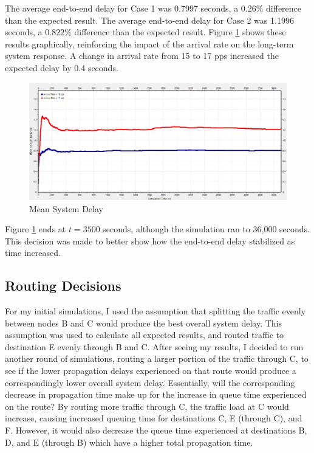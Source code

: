 \documentclass{article}
\begin{document}
The average end-to-end delay for Case 1 was 0.7997 seconds, a $0.26 \%$ difference than the expected result.
The average end-to-end delay for Case 2 was 1.1996 seconds, a $0.822 \%$ difference than the expected result.
Figure \ref{fig:meanSysDelay} shows these results graphically, reinforcing the impact of the arrival rate on the long-term system response.
A change in arrival rate from 15 to 17 pps increased the expected delay by 0.4 seconds.

\begin{figure}[h!]
\centering
\includegraphics[scale=0.5]{Images/MeanSysDelay.PNG}
\caption{Mean System Delay}
\label{fig:meanSysDelay}
\end{figure}

Figure \ref{fig:meanSysDelay} ends at $t=3500$ seconds, although the simulation ran to 36,000 seconds.  
This decision was made to better show how the end-to-end delay stabilized as time increased.


\subsection{Routing Decisions}
For my initial simulations, I used the assumption that splitting the traffic evenly between nodes B and C would produce the best overall system delay.
This assumption was used to calculate all expected results, and routed traffic to destination E evenly through B and C.
After seeing my results, I decided to run another round of simulations, routing a larger portion of the traffic through C, to see if the lower propagation delays experienced on that route would produce a correspondingly lower overall system delay.
Essentially, will the corresponding decrease in propagation time make up for the increase in queue time experienced on the route?
By routing more traffic through C, the traffic load at C would increase, causing increased queuing time for destinations C, E (through C), and F.  
However, it would also decrease the queue time experienced at destinations B, D, and E (through B) which have a higher total propagation time.
\end{document}
